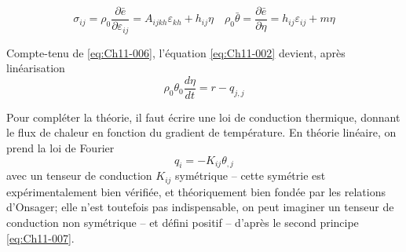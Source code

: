 \begin{equation}
    \sigma_{ij} = \rho_0 \frac{\partial \bar{e}}{\partial \varepsilon_{ij}} = A_{ijkh} \varepsilon_{kh} + h_{ij} \eta \quad \rho_0 \bar{\theta} = \frac{\partial \bar{e}}{\partial \eta} = h_{ij} \varepsilon_{ij} + m \eta
    \label{eq:Ch11-011}
\end{equation}

Compte-tenu de \eqref{eq:Ch11-006}, l'équation \eqref{eq:Ch11-002} devient, après linéarisation 
\begin{equation}
    \rho_0 \theta_0 \frac{d \eta}{dt} = r - q_{j,j}
    \label{eq:Ch11-012}
\end{equation}

Pour compléter la théorie, il faut écrire une loi de conduction thermique, donnant le flux de chaleur en fonction du gradient de température.
En théorie linéaire, on prend la loi de Fourier 
\begin{equation}
    q_i = -K_{ij} \theta_{,j}
    \label{eq:Ch11-013}
\end{equation}
avec un tenseur de conduction $K_{ij}$ symétrique -- cette symétrie est expérimentalement bien vérifiée, et théoriquement bien fondée par les relations d'Onsager; elle n'est toutefois pas indispensable, on peut imaginer un tenseur de conduction non symétrique -- et défini positif -- d'après le second principe \eqref{eq:Ch11-007}.

